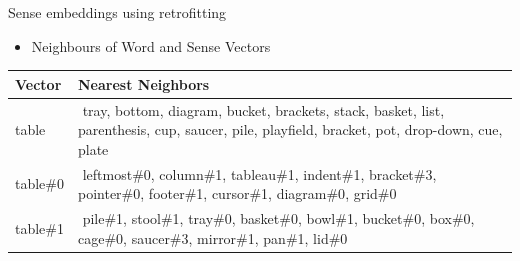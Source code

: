 \begin{frame}{Sense embeddings using retrofitting}

\begin{itemize}
	\item Neighbours of Word and Sense Vectors
\end{itemize}


%

\begin{tabular}{l|p{9cm}}
\bf Vector & \bf {Nearest Neighbors} \\ \toprule
 table & $ $ \alert{tray}, \textcolor{Cerulean}{bottom}, \textcolor{Cerulean}{diagram}, \alert{bucket}, \textcolor{Cerulean}{brackets}, \textcolor{Cerulean}{stack}, \alert{basket}, \textcolor{Cerulean}{list}, \textcolor{Cerulean}{parenthesis}, \alert{cup}, \alert{saucer}, \alert{pile}, \alert{playfield}, \textcolor{Cerulean}{bracket}, \alert{pot}, \textcolor{Cerulean}{drop-down}, \alert{cue}, \alert{plate} \\ \midrule
 \pause
  \textcolor{Cerulean}{table\#0} & $ $ \textcolor{Cerulean}{leftmost\#0},  \textcolor{Cerulean}{column\#1},  \textcolor{Cerulean}{tableau\#1},  \textcolor{Cerulean}{indent\#1},  \textcolor{Cerulean}{bracket\#3},  \textcolor{Cerulean}{pointer\#0},  \textcolor{Cerulean}{footer\#1}, \textcolor{Cerulean}{cursor\#1}, \textcolor{Cerulean}{diagram\#0}, \textcolor{Cerulean}{grid\#0} \\ \midrule
   \alert{table\#1} & $ $ \alert{pile\#1,  stool\#1,  tray\#0,  basket\#0,  bowl\#1,  bucket\#0,  box\#0,  cage\#0,  saucer\#3,      mirror\#1,  pan\#1,  lid\#0}  \\ 
\end{tabular}
	

\end{frame}





